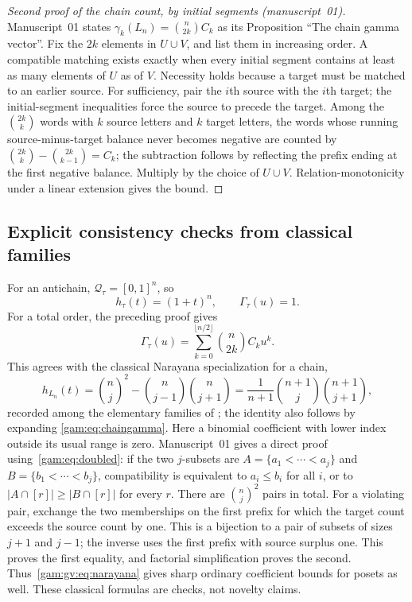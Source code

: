 \documentclass[11pt]{article}
\numberwithin{equation}{section}
\theoremstyle{definition}
\newcommand{\Qt}{\mathcal Q_\tau}
\begin{document}
\begin{proof}[Second proof of the chain count, by initial segments (manuscript~01)]
Manuscript~01 states $\gamma_k(L_n)=\binom n{2k}C_k$ as its Proposition
``The chain gamma vector''. Fix the $2k$ elements in $U\cup V$, and list
them in increasing order. A compatible matching exists exactly when every
initial segment contains at least as many elements of $U$ as of $V$.
Necessity holds because a target must be matched to an earlier source. For
sufficiency, pair the $i$th source with the $i$th target; the
initial-segment inequalities force the source to precede the target. Among
the $\binom{2k}k$ words with $k$ source letters and $k$ target letters, the
words whose running source-minus-target balance never becomes negative are
counted by $\binom{2k}k-\binom{2k}{k-1}=C_k$; the subtraction follows by
reflecting the prefix ending at the first negative balance. Multiply by the
choice of $U\cup V$. Relation-monotonicity under a linear extension gives
the bound.
\end{proof}

\subsection{Explicit consistency checks from classical families}
For an antichain, $\Qt=[0,1]^n$, so
\begin{equation}
 h_\tau(t)=(1+t)^n,\qquad \Gamma_\tau(u)=1.
 \label{gam:eq:antichainh}
\end{equation}
For a total order, the preceding proof gives
\begin{equation}
 \Gamma_\tau(u)=\sum_{k=0}^{\lfloor n/2\rfloor}\binom n{2k}C_k u^k.
 \label{gam:eq:chaingamma}
\end{equation}
This agrees with the classical Narayana specialization for a chain,
\begin{equation}
 [t^j]h_{L_n}(t)
  =\binom n j^2-\binom n{j-1}\binom n{j+1}
  =\frac1{n+1}\binom{n+1}j\binom{n+1}{j+1},
 \label{gam:gv:eq:narayana}
\end{equation}
recorded among the elementary families of \cite{AC}; the identity also
follows by expanding \eqref{gam:eq:chaingamma}. Here a binomial coefficient
with lower index outside its usual range is zero. Manuscript~01 gives a
direct proof using~\eqref{gam:eq:doubled}: if the two $j$-subsets are
$A=\{a_1<\cdots<a_j\}$ and $B=\{b_1<\cdots<b_j\}$, compatibility is
equivalent to $a_i\le b_i$ for all $i$, or to $|A\cap[r]|\ge|B\cap[r]|$ for
every $r$. There are $\binom n j^2$ pairs in total. For a violating pair,
exchange the two memberships on the first prefix for which the target count
exceeds the source count by one. This is a bijection to a pair of subsets of
sizes $j+1$ and $j-1$; the inverse uses the first prefix with source surplus
one. This proves the first equality, and factorial simplification proves
the second. Thus~\eqref{gam:gv:eq:narayana} gives sharp ordinary coefficient
bounds for posets as well. These classical formulas are checks, not novelty
claims.
\end{document}
